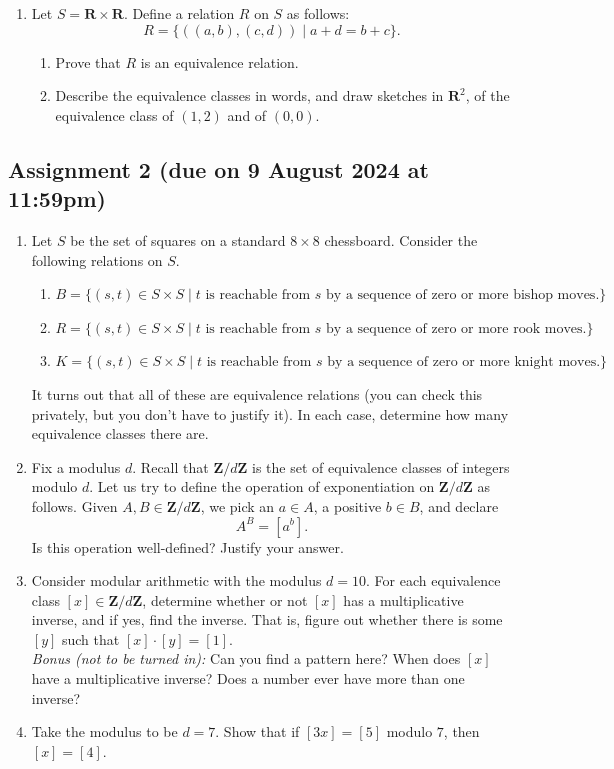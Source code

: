\documentclass{amsart}
\begin{document}
\begin{enumerate}
\item Let \(S = \mathbf{R} \times \mathbf{R}\).
Define a relation \(R\) on \(S\) as follows:
\[ R = \{((a,b),(c,d)) \mid a + d = b + c\}.\]

\begin{enumerate}
\item Prove that \(R\) is an equivalence relation.

\item Describe the equivalence classes in words, and draw sketches in \(\mathbf{R}^{2}\), of the equivalence class of \((1,2)\) and of \((0,0)\).
\end{enumerate}
\end{enumerate}
\subsection{Assignment 2 (due on 9 August 2024 at 11:59pm)}
\label{sec:orgd344ac9}
\togglefalse{solutions}

\begin{enumerate}
\item Let \(S\) be the set of squares on a standard \(8 \times 8\) chessboard.
Consider the following relations on \(S\).
\begin{enumerate}
\item \(B = \{(s,t) \in S \times S \mid t \text{ is reachable from }s\text{ by a sequence of zero or more bishop moves.} \}\)
\item \(R = \{(s,t) \in S \times S \mid t \text{ is reachable from }s\text{ by a sequence of zero or more rook moves.} \}\)
\item \(K = \{(s,t) \in S \times S \mid t \text{ is reachable from }s\text{ by a sequence of zero or more knight moves.} \}\)
\end{enumerate}
It turns out that all of these are equivalence relations (you can check this privately, but you don't have to justify it).
In each case, determine how many equivalence classes there are.

\item Fix a modulus \(d\).
Recall that \(\mathbf{Z}/d \mathbf{Z}\) is the set of equivalence classes of integers modulo \(d\).
Let us try to define the operation of exponentiation on \(\mathbf{Z}/d \mathbf{Z}\) as follows.
Given  \(A, B \in \mathbf{Z} / d \mathbf{Z}\), we pick an \(a \in A\), a positive \(b \in B\), and declare
\[ A^B = [a^b].\]
Is this operation well-defined? Justify your answer.

\item Consider modular arithmetic with the modulus \(d = 10\). For each equivalence class \([x] \in \mathbf{Z}/d \mathbf{Z}\), determine whether or not \([x]\) has a multiplicative inverse, and if yes, find the inverse. 
That is, figure out whether there is some \([y]\) such that \([x]\cdot[y] = [1]\).\\
\emph{Bonus (not to be turned in):} Can you find a pattern here? When does \([x]\) have a multiplicative inverse?  Does a number ever have more than one inverse?

\item Take the modulus to be \(d = 7\). Show that if \([3x] = [5]\) modulo \(7\), then \([x] = [4]\).
\end{enumerate}
\end{document}
